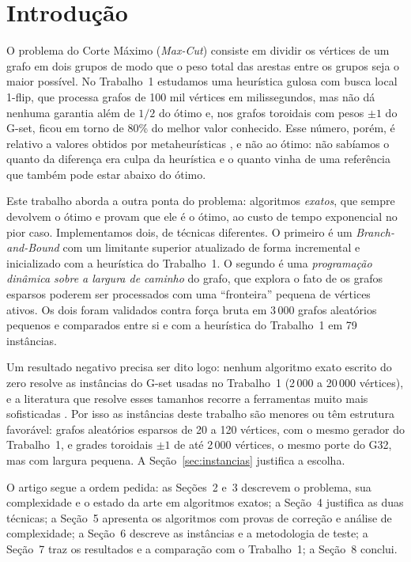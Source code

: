 \section{Introdução}

O problema do Corte Máximo (\emph{Max-Cut}) consiste em dividir os vértices de um grafo em dois grupos de modo que o peso total das arestas entre os grupos seja o maior possível. No Trabalho~1 estudamos uma heurística gulosa com busca local 1-flip, que processa grafos de 100 mil vértices em milissegundos, mas não dá nenhuma garantia além de $1/2$ do ótimo e, nos grafos toroidais com pesos $\pm1$ do G-set, ficou em torno de 80\% do melhor valor conhecido. Esse número, porém, é relativo a valores obtidos por metaheurísticas \cite{Benlic and Hao 2013}, e não ao ótimo: não sabíamos o quanto da diferença era culpa da heurística e o quanto vinha de uma referência que também pode estar abaixo do ótimo.

Este trabalho aborda a outra ponta do problema: algoritmos \emph{exatos}, que sempre devolvem o ótimo e provam que ele é o ótimo, ao custo de tempo exponencial no pior caso. Implementamos dois, de técnicas diferentes. O primeiro é um \emph{Branch-and-Bound} com um limitante superior atualizado de forma incremental e inicializado com a heurística do Trabalho~1. O segundo é uma \emph{programação dinâmica sobre a largura de caminho} do grafo, que explora o fato de os grafos esparsos poderem ser processados com uma ``fronteira'' pequena de vértices ativos. Os dois foram validados contra força bruta em 3\,000 grafos aleatórios pequenos e comparados entre si e com a heurística do Trabalho~1 em 79 instâncias.

Um resultado negativo precisa ser dito logo: nenhum algoritmo exato escrito do zero resolve as instâncias do G-set usadas no Trabalho~1 (2\,000 a 20\,000 vértices), e a literatura que resolve esses tamanhos recorre a ferramentas muito mais sofisticadas \cite{Liers et al. 2004, Rendl et al. 2010}. Por isso as instâncias deste trabalho são menores ou têm estrutura favorável: grafos aleatórios esparsos de 20 a 120 vértices, com o mesmo gerador do Trabalho~1, e grades toroidais $\pm1$ de até 2\,000 vértices, o mesmo porte do G32, mas com largura pequena. A Seção~\ref{sec:instancias} justifica a escolha.

O artigo segue a ordem pedida: as Seções~2 e~3 descrevem o problema, sua complexidade e o estado da arte em algoritmos exatos; a Seção~4 justifica as duas técnicas; a Seção~5 apresenta os algoritmos com provas de correção e análise de complexidade; a Seção~6 descreve as instâncias e a metodologia de teste; a Seção~7 traz os resultados e a comparação com o Trabalho~1; a Seção~8 conclui.

